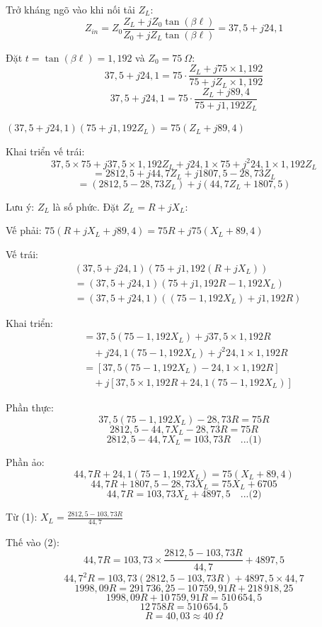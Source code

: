 \documentclass[12pt,a4paper]{article}
\begin{document}
Trở kháng ngõ vào khi nối tải $Z_L$:
\[
Z_{in} = Z_0 \frac{Z_L + jZ_0\tan(\beta\ell)}{Z_0 + jZ_L\tan(\beta\ell)} = 37{,}5 + j24{,}1
\]

Đặt $t = \tan(\beta\ell) = 1{,}192$ và $Z_0 = 75~\Omega$:
\[
37{,}5 + j24{,}1 = 75 \cdot \frac{Z_L + j75 \times 1{,}192}{75 + jZ_L \times 1{,}192}
\]
\[
37{,}5 + j24{,}1 = 75 \cdot \frac{Z_L + j89{,}4}{75 + j1{,}192 Z_L}
\]

$(37{,}5 + j24{,}1)(75 + j1{,}192 Z_L) = 75(Z_L + j89{,}4)$

Khai triển vế trái:
\[
37{,}5 \times 75 + j37{,}5 \times 1{,}192 Z_L + j24{,}1 \times 75 + j^2 24{,}1 \times 1{,}192 Z_L
\]
\[
= 2812{,}5 + j44{,}7Z_L + j1807{,}5 - 28{,}73Z_L
\]
\[
= (2812{,}5 - 28{,}73Z_L) + j(44{,}7Z_L + 1807{,}5)
\]

Lưu ý: $Z_L$ là số phức. Đặt $Z_L = R + jX_L$:

Vế phải: $75(R + jX_L + j89{,}4) = 75R + j75(X_L + 89{,}4)$

Vế trái:
\begin{align*}
&(37{,}5 + j24{,}1)(75 + j1{,}192(R + jX_L)) \\
&= (37{,}5 + j24{,}1)(75 + j1{,}192R - 1{,}192X_L) \\
&= (37{,}5 + j24{,}1)((75 - 1{,}192X_L) + j1{,}192R)
\end{align*}

Khai triển:
\begin{align*}
&= 37{,}5(75 - 1{,}192X_L) + j37{,}5 \times 1{,}192R \\
&\quad + j24{,}1(75 - 1{,}192X_L) + j^2 24{,}1 \times 1{,}192R \\
&= [37{,}5(75 - 1{,}192X_L) - 24{,}1 \times 1{,}192R] \\
&\quad + j[37{,}5 \times 1{,}192R + 24{,}1(75 - 1{,}192X_L)]
\end{align*}

Phần thực:
\[
37{,}5(75 - 1{,}192X_L) - 28{,}73R = 75R
\]
\[
2812{,}5 - 44{,}7X_L - 28{,}73R = 75R
\]
\[
2812{,}5 - 44{,}7X_L = 103{,}73R \quad \text{...(1)}
\]

Phần ảo:
\[
44{,}7R + 24{,}1(75 - 1{,}192X_L) = 75(X_L + 89{,}4)
\]
\[
44{,}7R + 1807{,}5 - 28{,}73X_L = 75X_L + 6705
\]
\[
44{,}7R = 103{,}73X_L + 4897{,}5 \quad \text{...(2)}
\]

Từ (1): $X_L = \frac{2812{,}5 - 103{,}73R}{44{,}7}$

Thế vào (2):
\[
44{,}7R = 103{,}73 \times \frac{2812{,}5 - 103{,}73R}{44{,}7} + 4897{,}5
\]
\[
44{,}7^2 R = 103{,}73(2812{,}5 - 103{,}73R) + 4897{,}5 \times 44{,}7
\]
\[
1998{,}09R = 291\,736{,}25 - 10\,759{,}91R + 218\,918{,}25
\]
\[
1998{,}09R + 10\,759{,}91R = 510\,654{,}5
\]
\[
12\,758R = 510\,654{,}5
\]
\[
R = 40{,}03 \approx 40~\Omega
\]
\end{document}
